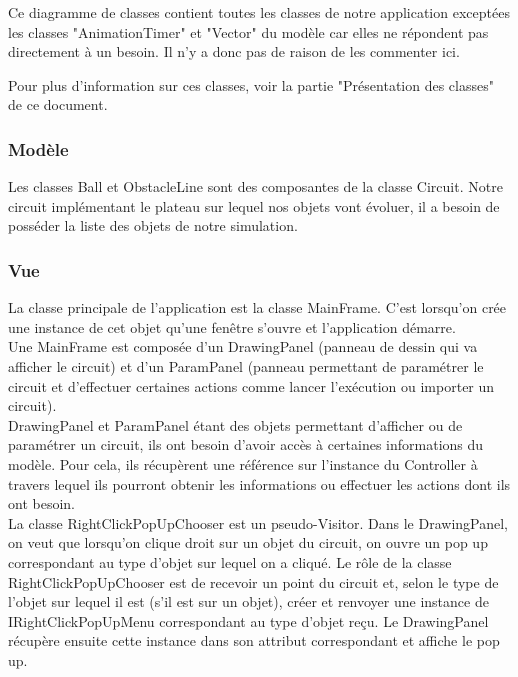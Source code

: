 \documentclass{report}
\begin{document}
Ce diagramme de classes contient toutes les classes de notre application exceptées les classes "AnimationTimer" et "Vector" du modèle car elles ne répondent pas directement à un besoin. Il n'y a donc pas de raison de les commenter ici.

Pour plus d'information sur ces classes, voir la partie "Présentation des classes" de ce document.

\subsubsection{Modèle}

Les classes Ball et ObstacleLine sont des composantes de la classe Circuit. Notre circuit implémentant le plateau sur lequel nos objets vont évoluer, il a besoin de posséder la liste des objets de notre simulation.

\subsubsection{Vue}

La classe principale de l'application est la classe MainFrame. C'est lorsqu'on crée une instance de cet objet qu'une fenêtre s'ouvre et l'application démarre. \\

Une MainFrame est composée d'un DrawingPanel (panneau de dessin qui va afficher le circuit) et d'un ParamPanel (panneau permettant de paramétrer le circuit et d'effectuer certaines actions comme lancer l'exécution ou importer un circuit). \\

DrawingPanel et ParamPanel étant des objets permettant d'afficher ou de paramétrer un circuit, ils ont besoin d'avoir accès à certaines informations du modèle. Pour cela, ils récupèrent une référence sur l'instance du Controller à travers lequel ils pourront obtenir les informations ou effectuer les actions dont ils ont besoin. \\

La classe RightClickPopUpChooser est un pseudo-Visitor. Dans le DrawingPanel, on veut que lorsqu'on clique droit sur un objet du circuit, on ouvre un pop up correspondant au type d'objet sur lequel on a cliqué. Le rôle de la classe RightClickPopUpChooser est de recevoir un point du circuit et, selon le type de l'objet sur lequel il est (s'il est sur un objet), créer et renvoyer une instance de  IRightClickPopUpMenu correspondant au type d'objet reçu. Le DrawingPanel récupère ensuite cette instance dans son attribut correspondant et affiche le pop up. \\
\end{document}
